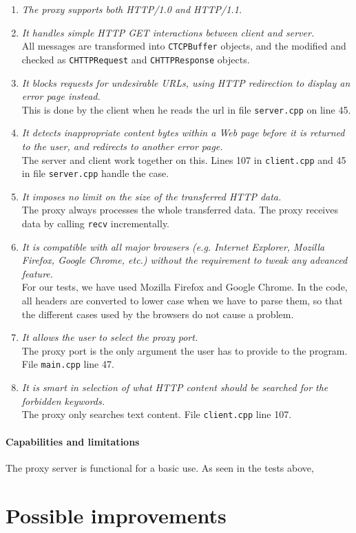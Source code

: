 \documentclass[12pt,a4paper]{article}
\begin{document}
\begin{enumerate}
\item \textit{The proxy supports both HTTP/1.0 and HTTP/1.1.}

\item \textit{It handles simple HTTP GET interactions between client and server.}\\
All messages are transformed into \texttt{CTCPBuffer} objects, and the modified and checked as \texttt{CHTTPRequest} and \texttt{CHTTPResponse} objects. 

\item \textit{It blocks requests for undesirable URLs, using HTTP redirection to display an error page instead.}\\
This is done by the client when he reads the url in file \texttt{server.cpp} on line 45.

\item \textit{It detects inappropriate content bytes within a Web page before it is returned to the user, and redirects to another error page.}\\
The server and client work together on this. Lines 107 in \texttt{client.cpp} and 45 in file \texttt{server.cpp} handle the case.

\item \textit{It imposes no limit on the size of the transferred HTTP data.}\\
The proxy always processes the whole transferred data. The proxy receives data by calling \texttt{recv} incrementally.

\item \textit{It is compatible with all major browsers (e.g. Internet Explorer, Mozilla Firefox, Google Chrome, etc.) without the requirement to tweak any advanced feature.}\\
For our tests, we have used Mozilla Firefox and Google Chrome. In the code, all headers are converted to lower case when we have to parse them, so that the different cases used by the browsers do not cause a problem.

\item \textit{It allows the user to select the proxy port.}\\
The proxy port is the only argument the user has to provide to the program. File \texttt{main.cpp} line 47.

\item \textit{It is smart in selection of what HTTP content should be searched for the forbidden keywords.}\\
The proxy only searches text content. File \texttt{client.cpp} line 107.

\end{enumerate}


\paragraph{Capabilities and limitations}
The proxy server is functional for a basic use. As seen in the tests above, %


\section{Possible improvements}

    
\end{document}
